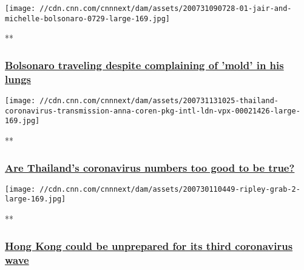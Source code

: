 \href{/videos/world/2020/07/31/brazil-jair-michelle-bolsonaro-traveling-coronavirus-infection-lungs-npw-tsr-intl-vpx.cnn/video/playlists/coronavirus-intl/}{}

\texttt{[image: //cdn.cnn.com/cnnnext/dam/assets/200731090728-01-jair-and-michelle-bolsonaro-0729-large-169.jpg]}

**

\hypertarget{bolsonaro-traveling-despite-complaining-of-mold-in-his-lungs}{%
\subsubsection{\texorpdfstring{\href{/videos/world/2020/07/31/brazil-jair-michelle-bolsonaro-traveling-coronavirus-infection-lungs-npw-tsr-intl-vpx.cnn/video/playlists/coronavirus-intl/}{Bolsonaro
traveling despite complaining of 'mold' in his
lungs}}{Bolsonaro traveling despite complaining of 'mold' in his lungs}}\label{bolsonaro-traveling-despite-complaining-of-mold-in-his-lungs}}

\href{/videos/world/2020/07/31/thailand-coronavirus-transmission-anna-coren-pkg-intl-ldn-vpx.cnn/video/playlists/coronavirus-intl/}{}

\texttt{[image: //cdn.cnn.com/cnnnext/dam/assets/200731131025-thailand-coronavirus-transmission-anna-coren-pkg-intl-ldn-vpx-00021426-large-169.jpg]}

**

\hypertarget{are-thailands-coronavirus-numbers-too-good-to-be-true-}{%
\subsubsection{\texorpdfstring{\href{/videos/world/2020/07/31/thailand-coronavirus-transmission-anna-coren-pkg-intl-ldn-vpx.cnn/video/playlists/coronavirus-intl/}{Are
Thailand's coronavirus numbers too good to be true?
}}{Are Thailand's coronavirus numbers too good to be true? }}\label{are-thailands-coronavirus-numbers-too-good-to-be-true-}}

\href{/videos/world/2020/07/30/hong-kong-third-wave-will-ripley-pkg-intl-ldn-vpx.cnn/video/playlists/coronavirus-intl/}{}

\texttt{[image: //cdn.cnn.com/cnnnext/dam/assets/200730110449-ripley-grab-2-large-169.jpg]}

**

\hypertarget{hong-kong-could-be-unprepared-for-its-third-coronavirus-wave}{%
\subsubsection{\texorpdfstring{\href{/videos/world/2020/07/30/hong-kong-third-wave-will-ripley-pkg-intl-ldn-vpx.cnn/video/playlists/coronavirus-intl/}{Hong
Kong could be unprepared for its third coronavirus
wave}}{Hong Kong could be unprepared for its third coronavirus wave}}\label{hong-kong-could-be-unprepared-for-its-third-coronavirus-wave}}

